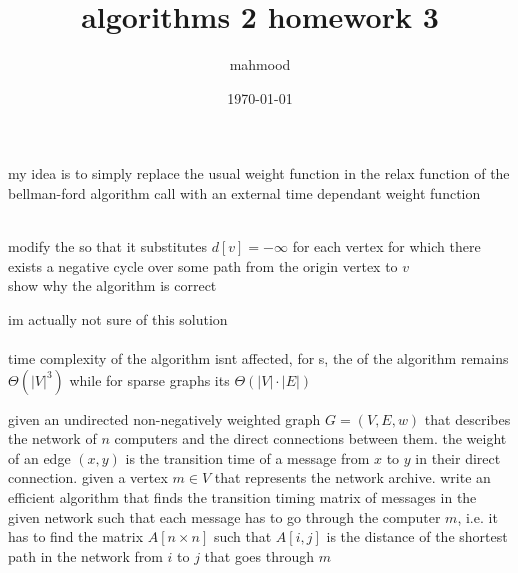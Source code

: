 \documentclass[a4paper,12pt]{article}
\author{mahmood}
\date{\today}
\title{algorithms 2 homework 3}
\begin{document}
\maketitle
\begin{question}
\begin{answer}
my idea is to simply replace the usual weight function in the relax function of the bellman-ford algorithm call with an external time dependant weight function\\
\\
\end{answer}
\end{question}
\begin{question}
modify the so that it substitutes \(d[v] = -\infty\) for each vertex for which there exists a negative cycle over some path from the origin vertex to \(v\)\\
show why the algorithm is correct\\
\begin{answer}
im actually not sure of this solution\\
\\

time complexity of the algorithm isnt affected, for s, the of the algorithm remains \(\Theta\left(|V|^3\right)\) while for sparse graphs its \(\Theta(|V| \cdot |E|)\)\\
\end{answer}
\end{question}
\begin{question}
given an undirected non-negatively weighted graph \(G=(V,E,w)\) that describes the network of \(n\) computers and the direct connections between them. the weight of an edge \((x,y)\) is the transition time of a message from \(x\) to \(y\) in their direct connection. given a vertex \(m \in V\) that represents the network archive. write an efficient algorithm that finds the transition timing matrix of messages in the given network such that each message has to go through the computer \(m\), i.e. it has to find the matrix \(A[n \times n]\) such that \(A[i,j]\) is the distance of the shortest path in the network from \(i\) to \(j\) that goes through \(m\)\\
\begin{answer}
\\
\end{answer}
\end{question}
\end{document}

